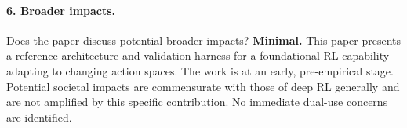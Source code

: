 \documentclass{article}
\begin{document}
\paragraph{6. Broader impacts.}
Does the paper discuss potential broader impacts?
\textbf{Minimal.} This paper presents a reference architecture and validation
harness for a foundational RL capability---adapting to changing action spaces.
The work is at an early, pre-empirical stage. Potential societal impacts are
commensurate with those of deep RL generally and are not amplified by this
specific contribution. No immediate dual-use concerns are identified.
\end{document}
